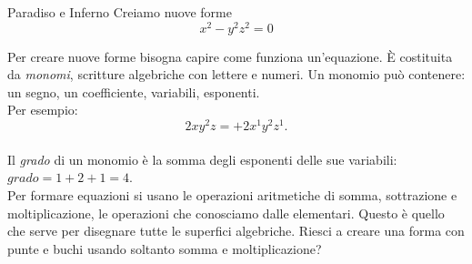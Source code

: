 \begin{surferPage}{Paradiso e Inferno}
Creiamo nuove forme \\
\smallskip
\[x^2	- y^2z^2	= 0\]

\singlespacing
Per creare nuove forme bisogna capire come funziona un'equazione. \`E costituita da {\it monomi}, scritture algebriche con lettere e numeri.
\singlespacing
Un monomio pu\`o contenere:
un segno, un coefficiente, variabili, esponenti.\\
\singlespacing
Per esempio: 
\smallskip
\[2xy^2z = +2x^1y^2z^1.\]
\\
\smallskip
Il  {\it grado} di un monomio \`e la somma degli esponenti delle sue variabili: $grado = 1+2+1=4$.  \\
\singlespacing
Per formare equazioni si usano le operazioni aritmetiche di somma, sottrazione e moltiplicazione, le operazioni che conosciamo dalle elementari. Questo \`e quello che serve per disegnare tutte le superfici algebriche.
\singlespacing
Riesci a creare una forma con punte e buchi usando soltanto somma e moltiplicazione?
\end{surferPage}
